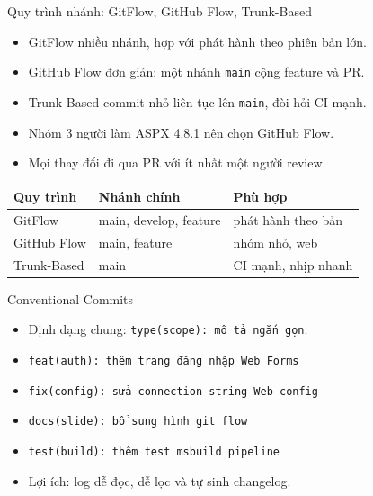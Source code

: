 \begin{frame}{Quy trình nhánh: GitFlow, GitHub Flow, Trunk-Based}
\begin{itemize}
\item GitFlow nhiều nhánh, hợp với phát hành theo phiên bản lớn.
\item GitHub Flow đơn giản: một nhánh \texttt{main} cộng feature và PR.
\item Trunk-Based commit nhỏ liên tục lên \texttt{main}, đòi hỏi CI mạnh.
\item Nhóm 3 người làm ASPX 4.8.1 nên chọn GitHub Flow.
\item Mọi thay đổi đi qua PR với ít nhất một người review.
\end{itemize}
\begin{tabular}{lll}
\toprule
Quy trình & Nhánh chính & Phù hợp \\
\midrule
GitFlow & main, develop, feature & phát hành theo bản \\
GitHub Flow & main, feature & nhóm nhỏ, web \\
Trunk-Based & main & CI mạnh, nhịp nhanh \\
\bottomrule
\end{tabular}
\end{frame}

\begin{frame}{Conventional Commits}
\begin{itemize}
\item Định dạng chung: \texttt{type(scope): mô tả ngắn gọn}.
\item \texttt{feat(auth): thêm trang đăng nhập Web Forms}
\item \texttt{fix(config): sửa connection string Web config}
\item \texttt{docs(slide): bổ sung hình git flow}
\item \texttt{test(build): thêm test msbuild pipeline}
\item Lợi ích: log dễ đọc, dễ lọc và tự sinh changelog.
\end{itemize}
\end{frame}
